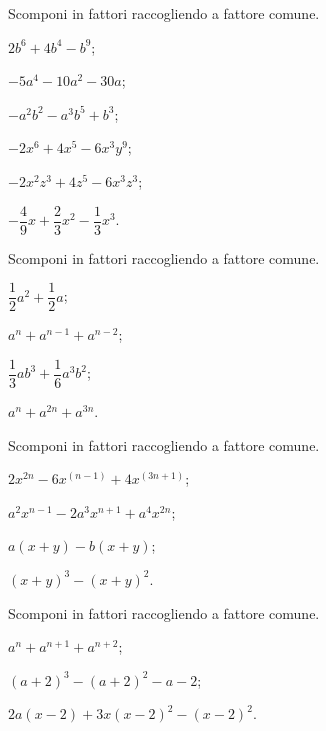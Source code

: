 \begin{esercizio}
\label{ese:13.10}
Scomponi in fattori raccogliendo a fattore comune.
\begin{multicols}{3}
\begin{enumeratea}
 \item $2b^{6}+4b^{4}-b^{9}$;
 \item $-5a^{4}-10a^{2}-30a$;
 \item $-a^{2}b^{2}-a^{3}b^{5}+b^{3}$;
 \item $-2x^{6}+4x^{5}-6x^{3}y^{9}$;
 \item $-2x^{2}z^{3}+4z^{5}-6x^{3}z^{3}$;
 \item $-{\dfrac{4}{9}}x+\dfrac{2}{3}x^{2}-\dfrac{1}{3}x^{3}$.
\end{enumeratea}
\end{multicols}
\end{esercizio}

\begin{esercizio}
\label{ese:13.11}
Scomponi in fattori raccogliendo a fattore comune.
\begin{multicols}{2}
\begin{enumeratea}
 \item $\dfrac{1}{2}a^{2}+\dfrac{1}{2}a$;
 \item $a^{n}+a^{n-1}+a^{n-2}$;
 \item $\dfrac{1}{3}ab^{3}+\dfrac{1}{6}a^{3}b^{2}$;
 \item $a^{n}+a^{2n}+a^{3n}$.
\end{enumeratea}
\end{multicols}
\end{esercizio}

\begin{esercizio}
\label{ese:13.12}
Scomponi in fattori raccogliendo a fattore comune.
\begin{multicols}{2}
\begin{enumeratea}
 \item $2x^{2n}-6x^{(n-1)}+4x^{(3n+1)}$;
 \item $a^{2}x^{n-1}-2a^{3}x^{n+1}+a^{4}x^{2n}$;
 \item $a(x+y)-b(x+y)$;
 \item $(x+y)^{3}-(x+y)^{2}$.
\end{enumeratea}
\end{multicols}
\end{esercizio}

\begin{esercizio}[\Ast]
\label{ese:13.13}
Scomponi in fattori raccogliendo a fattore comune.
 \begin{multicols}{2}
 \begin{enumeratea}
 \item $a^{n}+a^{n+1}+a^{n+2}$;
 \item $(a+2)^{3}-(a+2)^{2}-a-2$;
 \item $2a(x-2)+3x(x-2)^{2}-(x-2)^{2}$.
\end{enumeratea}
 \end{multicols}
\end{esercizio}

